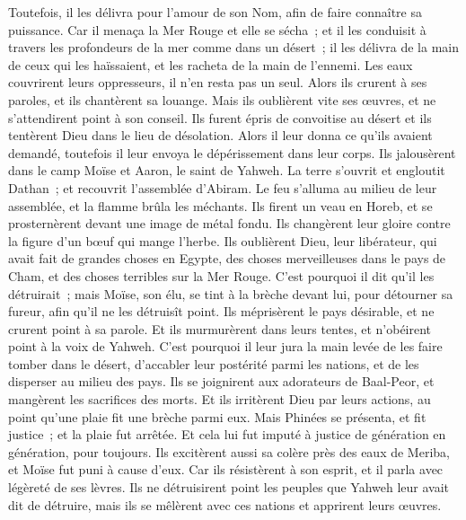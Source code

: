 \begin{multicols}{2}
Toutefois, il les délivra pour l'amour de son Nom, afin de faire connaître sa puissance.
Car il menaça la Mer Rouge et elle se sécha~; et il les conduisit à travers les profondeurs de la mer comme dans un désert~;
il les délivra de la main de ceux qui les haïssaient, et les racheta de la main de l'ennemi.
Les eaux couvrirent leurs oppresseurs, il n'en resta pas un seul.
Alors ils crurent à ses paroles, et ils chantèrent sa louange.
Mais ils oublièrent vite ses œuvres, et ne s'attendirent point à son conseil.
Ils furent épris de convoitise au désert et ils tentèrent Dieu dans le lieu de désolation.
Alors il leur donna ce qu'ils avaient demandé, toutefois il leur envoya le dépérissement dans leur corps.
Ils jalousèrent dans le camp Moïse et Aaron, le saint de Yahweh.
La terre s'ouvrit et engloutit Dathan~; et recouvrit l'assemblée d'Abiram.
Le feu s'alluma au milieu de leur assemblée, et la flamme brûla les méchants.
Ils firent un veau en Horeb, et se prosternèrent devant une image de métal fondu.
Ils changèrent leur gloire contre la figure d'un bœuf qui mange l'herbe.
Ils oublièrent Dieu, leur libérateur, qui avait fait de grandes choses en Egypte,
des choses merveilleuses dans le pays de Cham, et des choses terribles sur la Mer Rouge.
C'est pourquoi il dit qu'il les détruirait~; mais Moïse, son élu, se tint à la brèche devant lui, pour détourner sa fureur, afin qu'il ne les détruisît point.
Ils méprisèrent le pays désirable, et ne crurent point à sa parole.
Et ils murmurèrent dans leurs tentes, et n'obéirent point à la voix de Yahweh.
C'est pourquoi il leur jura la main levée de les faire tomber dans le désert,
d'accabler leur postérité parmi les nations, et de les disperser au milieu des pays.
Ils se joignirent aux adorateurs de Baal-Peor, et mangèrent les sacrifices des morts.
Et ils irritèrent Dieu par leurs actions, au point qu'une plaie fit une brèche parmi eux.
Mais Phinées se présenta, et fit justice~; et la plaie fut arrêtée.
Et cela lui fut imputé à justice de génération en génération, pour toujours.
Ils excitèrent aussi sa colère près des eaux de Meriba, et Moïse fut puni à cause d'eux.
Car ils résistèrent à son esprit, et il parla avec légèreté de ses lèvres.
Ils ne détruisirent point les peuples que Yahweh leur avait dit de détruire,
mais ils se mêlèrent avec ces nations et apprirent leurs œuvres.

\end{multicols}
